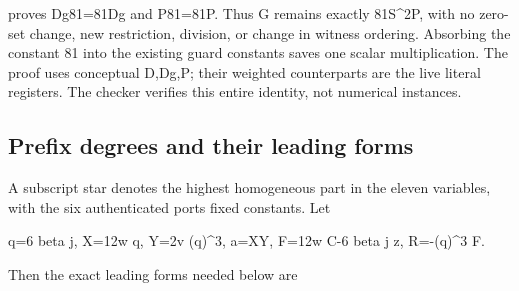 proves Dg81=\allowbreak{}81Dg and P81=\allowbreak{}81P. Thus G remains exactly 81S\textasciicircum{}\allowbreak{}2P, with no zero-set change, new restriction, division, or change in witness ordering. Absorbing the constant 81 into the existing guard constants saves one scalar multiplication. The proof uses conceptual D,Dg,P; their weighted counterparts are the live literal registers. The checker verifies this entire identity, not numerical instances.



\subsection*{Prefix degrees and their leading forms}



A subscript star denotes the highest homogeneous part in the eleven variables, with the six authenticated ports fixed constants. Let



q\textasteriskcentered{}\allowbreak{}=\allowbreak{}6 beta j, X\textasteriskcentered{}\allowbreak{}=\allowbreak{}12w q\textasteriskcentered{}\allowbreak{}, Y\textasteriskcentered{}\allowbreak{}=\allowbreak{}2v (q\textasteriskcentered{}\allowbreak{})\textasciicircum{}\allowbreak{}3, a\textasteriskcentered{}\allowbreak{}=\allowbreak{}X\textasteriskcentered{}\allowbreak{}Y\textasteriskcentered{}\allowbreak{}, F\textasteriskcentered{}\allowbreak{}=\allowbreak{}12w C-6 beta j z, R\textasteriskcentered{}\allowbreak{}=\allowbreak{}-(q\textasteriskcentered{}\allowbreak{})\textasciicircum{}\allowbreak{}3 F\textasteriskcentered{}\allowbreak{}.



Then the exact leading forms needed below are



